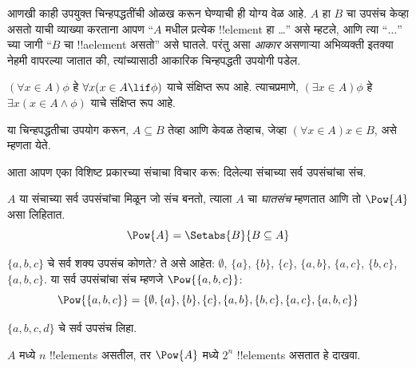 \documentclass[../../../include/open-logic-section]{subfiles}
\begin{document}
आणखी काही उपयुक्त चिन्हपद्धतींची ओळख करून घेण्याची ही योग्य वेळ आहे.
$A$ हा $B$ चा उपसंच केव्हा असतो याची व्याख्या करताना आपण
``$A$ मधील प्रत्येक !!{element} हा \dots'' असे म्हटले, आणि त्या
``$\dots$'' च्या जागी ``$B$ चा !!a{element} असतो'' असे घातले.
परंतु असा \emph{आकार} असणाऱ्या अभिव्यक्ती इतक्या नेहमी वापरल्या जातात की,
त्यांच्यासाठी आकारिक चिन्हपद्धती उपयोगी पडेल.

\begin{defn}
$(\forall x \in A)\phi$ हे $\forall x(x \in A \lif
\phi)$ याचे संक्षिप्त रूप आहे. त्याचप्रमाणे, $(\exists x \in A)\phi$ हे
$\exists x(x
\in A \land \phi)$ याचे संक्षिप्त रूप आहे.
\end{defn}

या चिन्हपद्धतीचा उपयोग करून, $A \subseteq B$ तेव्हा आणि केवळ तेव्हाच, जेव्हा
$(\forall
x \in A)x \in B$, असे म्हणता येते.

आता आपण एका विशिष्ट प्रकारच्या संचाचा विचार करू: दिलेल्या संचाच्या सर्व
उपसंचांचा संच.

\begin{defn}[घातसंच]
$A$ या संचाच्या सर्व उपसंचांचा मिळून जो संच बनतो, त्याला
$A$ चा \emph{घातसंच} म्हणतात आणि तो $\Pow{A}$ असा लिहितात.
  \[
    \Pow{A} = \Setabs{B}{B \subseteq A}
  \]
\end{defn}

\begin{ex}
$\{ a, b, c \}$ चे सर्व शक्य उपसंच कोणते? ते असे आहेत:
$\emptyset$, $\{a \}$, $\{b\}$, $\{c\}$, $\{a, b\}$, $\{a, c\}$, $\{b,
c\}$, $\{a, b, c\}$. या सर्व उपसंचांचा संच म्हणजे
$\Pow{\{a,b,c\}}$:
\[
\Pow{\{ a, b, c \}} = \{\emptyset, \{a \}, \{b\}, \{c\}, \{a, b\},
\{b, c\}, \{a, c\}, \{a, b, c\}\}
\]
\end{ex}

\begin{prob}
$\{a, b, c, d\}$ चे सर्व उपसंच लिहा.
\end{prob}

\begin{prob}
$A$ मध्ये $n$ !!{element}s असतील, तर $\Pow{A}$ मध्ये $2^n$
!!{element}s असतात हे दाखवा.
\end{prob}
\end{document}
